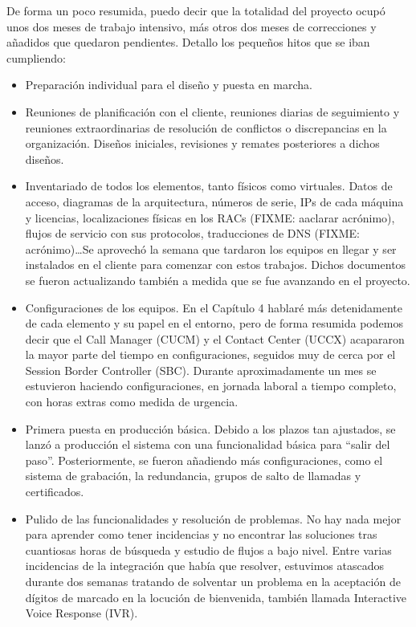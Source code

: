 \documentclass[a4paper, 12pt]{book}
\begin{document}
De forma un poco resumida, puedo decir que la totalidad del proyecto ocupó unos dos meses de trabajo intensivo, más otros dos meses de correcciones y añadidos que quedaron pendientes. Detallo los pequeños hitos que se iban cumpliendo:
\begin{itemize}
  \item Preparación individual para el diseño y puesta en marcha.
  
  \item Reuniones de planificación con el cliente, reuniones diarias de seguimiento y reuniones extraordinarias de resolución de conflictos o discrepancias en la organización. Diseños iniciales, revisiones y remates posteriores a dichos diseños.

  \item Inventariado de todos los elementos, tanto físicos como virtuales. Datos de acceso, diagramas de la arquitectura, números de serie, IPs de cada máquina y licencias, localizaciones físicas en los RACs (FIXME: aaclarar acrónimo), flujos de servicio con sus protocolos, traducciones de DNS (FIXME: acrónimo)\ldots Se aprovechó la semana que tardaron los equipos en llegar y ser instalados en el cliente para comenzar con estos trabajos. Dichos documentos se fueron actualizando también a medida que se fue avanzando en el proyecto.

  \item Configuraciones de los equipos. En el Capítulo 4 hablaré más detenidamente de cada elemento y su papel en el entorno, pero de forma resumida podemos decir que el Call Manager (CUCM) y el Contact Center (UCCX) acapararon la mayor parte del tiempo en configuraciones, seguidos muy de cerca por el Session Border Controller (SBC). Durante aproximadamente un mes se estuvieron haciendo configuraciones, en jornada laboral a tiempo completo, con horas extras como medida de urgencia.

  \item Primera puesta en producción básica. Debido a los plazos tan ajustados, se lanzó a producción el sistema con una funcionalidad básica para ``salir del paso''. Posteriormente, se fueron añadiendo más configuraciones, como el sistema de grabación, la redundancia, grupos de salto de llamadas y certificados.

  \item Pulido de las funcionalidades y resolución de problemas. No hay nada mejor para aprender como tener incidencias y no encontrar las soluciones tras cuantiosas horas de búsqueda y estudio de flujos a bajo nivel. Entre varias incidencias de la integración que había que resolver, estuvimos atascados durante dos semanas tratando de solventar un problema en la aceptación de dígitos de marcado en la locución de bienvenida, también llamada Interactive Voice Response (IVR).
  

\end{itemize}
\end{document}
